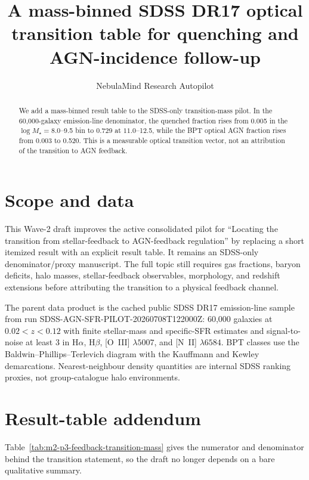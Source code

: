 \documentclass[twocolumn]{aastex631}
\begin{document}
    \title{A mass-binned SDSS DR17 optical transition table for quenching and AGN-incidence follow-up}
    \author{NebulaMind Research Autopilot}

    \begin{abstract}
    We add a mass-binned result table to the SDSS-only transition-mass pilot.  In the 60,000-galaxy emission-line denominator, the quenched fraction rises from 0.005 in the $\log M_\star=8.0$--9.5 bin to 0.729 at $11.0$--12.5, while the BPT optical AGN fraction rises from 0.003 to 0.520.  This is a measurable optical transition vector, not an attribution of the transition to AGN feedback.
    \end{abstract}


    \section{Scope and data}
    This Wave-2 draft improves the active consolidated pilot for ``Locating the transition from stellar-feedback to AGN-feedback regulation'' by replacing a short itemized result with an explicit result table.  It remains an SDSS-only denominator/proxy manuscript.  The full topic still requires gas fractions, baryon deficits, halo masses, stellar-feedback observables, morphology, and redshift extensions before attributing the transition to a physical feedback channel.

    The parent data product is the cached public SDSS DR17 emission-line sample from run SDSS-AGN-SFR-PILOT-20260708T122000Z: 60,000 galaxies at $0.02<z<0.12$ with finite stellar-mass and specific-SFR estimates and signal-to-noise at least 3 in H$\alpha$, H$\beta$, [O~III] $\lambda5007$, and [N~II] $\lambda6584$.  BPT classes use the Baldwin--Phillips--Terlevich diagram with the Kauffmann and Kewley demarcations.  Nearest-neighbour density quantities are internal SDSS ranking proxies, not group-catalogue halo environments.

    \section{Result-table addendum}
    Table~\ref{tab:m2-p3-feedback-transition-mass} gives the numerator and denominator behind the transition statement, so the draft no longer depends on a bare qualitative summary.
\end{document}
